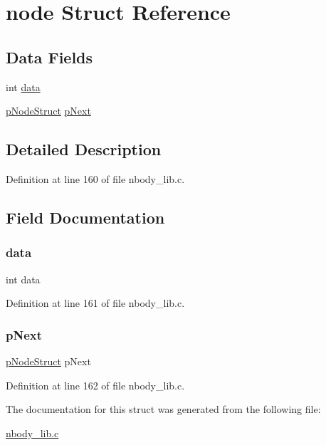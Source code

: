 \hypertarget{structnode}{}\section{node Struct Reference}
\label{structnode}
\subsection*{Data Fields}
\begin{DoxyCompactItemize}
\item 
int \hyperlink{structnode_a9eab91667db4d35c7231dcddf7b89a76}{data}
\item 
\hyperlink{nbody__lib_8c_ae0b865aeb3a8ca1bc05b13a0ffc168c6}{p\+Node\+Struct} \hyperlink{structnode_ab73a0aa5004ac3891e3bdb8ca5e68a37}{p\+Next}
\end{DoxyCompactItemize}


\subsection{Detailed Description}


Definition at line 160 of file nbody\+\_\+lib.\+c.



\subsection{Field Documentation}
\hypertarget{structnode_a9eab91667db4d35c7231dcddf7b89a76}{}\label{structnode_a9eab91667db4d35c7231dcddf7b89a76} 
\subsubsection{\texorpdfstring{data}{data}}
{\footnotesize\ttfamily int data}



Definition at line 161 of file nbody\+\_\+lib.\+c.

\hypertarget{structnode_ab73a0aa5004ac3891e3bdb8ca5e68a37}{}\label{structnode_ab73a0aa5004ac3891e3bdb8ca5e68a37} 
\subsubsection{\texorpdfstring{p\+Next}{pNext}}
{\footnotesize\ttfamily \hyperlink{nbody__lib_8c_ae0b865aeb3a8ca1bc05b13a0ffc168c6}{p\+Node\+Struct} p\+Next}



Definition at line 162 of file nbody\+\_\+lib.\+c.



The documentation for this struct was generated from the following file\+:\begin{DoxyCompactItemize}
\item 
\hyperlink{nbody__lib_8c}{nbody\+\_\+lib.\+c}\end{DoxyCompactItemize}

